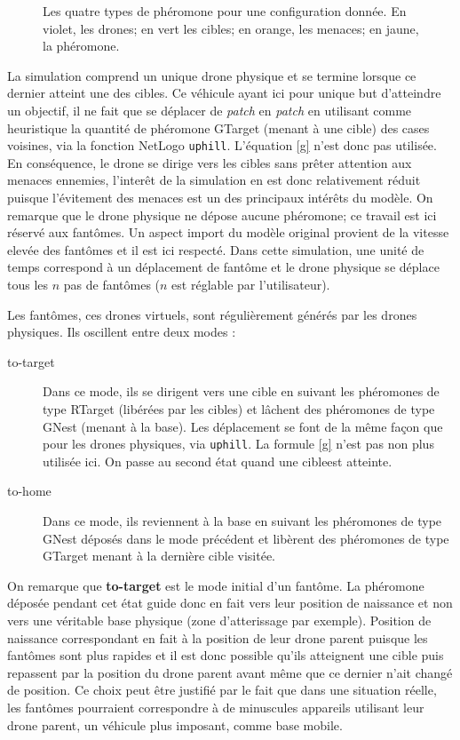 \documentclass[12pt]{article}
\begin{document}
\begin{figure}[p]
  \caption{Les quatre types de phéromone pour une configuration
    donnée. En violet, les drones; en vert les cibles; en orange, les
    menaces; en jaune, la phéromone.}
  \label{pheromones}
\end{figure}

La simulation comprend un unique drone physique et se termine lorsque ce
dernier atteint une des cibles. Ce véhicule ayant ici pour unique but
d'atteindre un objectif, il ne fait que se déplacer de \textit{patch}
en \textit{patch} en utilisant comme heuristique la quantité de
phéromone GTarget (menant à une cible) des cases voisines, via la fonction
NetLogo \texttt{uphill}. L'équation
\ref{g} n'est donc pas utilisée. En conséquence, le drone se dirige vers
les cibles sans prêter attention aux menaces ennemies, l'interêt de la simulation en est donc 
relativement réduit puisque l'évitement des menaces est un des principaux intérêts du modèle. 
On remarque que le drone physique ne dépose aucune
phéromone; ce travail est ici réservé aux fantômes.
Un aspect import du modèle original provient de la vitesse elevée des fantômes et il est ici respecté.
Dans cette simulation, une unité de temps correspond à un déplacement de fantôme et le drone physique 
se déplace tous les $n$ pas de fantômes ($n$ est réglable par l'utilisateur).

Les fantômes, ces drones virtuels, sont régulièrement générés par les drones 
physiques. Ils oscillent entre deux modes :

\begin{description}
  
  \item[to-target]{Dans ce mode, ils se dirigent vers une cible en suivant les phéromones
  de type RTarget (libérées par les cibles) et lâchent des 
  phéromones de type GNest (menant à la base). Les déplacement se font de la même façon que pour les drones
  physiques, via \texttt{uphill}. La formule \ref{g} n'est pas non plus utilisée ici. On passe au second état
  quand une cibleest atteinte.}

  \item[to-home]{Dans ce mode, ils reviennent à la base en suivant les phéromones de type
  GNest déposés dans le mode précédent et libèrent des phéromones de type GTarget menant 
  à la dernière cible visitée.}

\end{description}

On remarque que \textbf{to-target} est le mode initial d'un fantôme. La phéromone déposée pendant cet
état guide donc en fait vers leur position de naissance et non vers une véritable base physique (zone
d'atterissage par exemple). Position de naissance correspondant en fait à la position de leur drone parent
puisque les fantômes sont plus rapides et il est donc possible qu'ils atteignent une cible puis repassent 
par la position du drone parent avant même que ce dernier n'ait changé de position. Ce choix peut être justifié par le 
fait que dans une situation réelle, les fantômes pourraient correspondre à de minuscules appareils utilisant 
leur drone parent, un véhicule plus imposant, comme base mobile.
\end{document}
